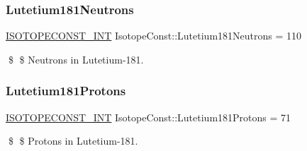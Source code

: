 \subsubsection{\texorpdfstring{Lutetium181\+Neutrons}{Lutetium181Neutrons}}
{\footnotesize\ttfamily \mbox{\hyperlink{group___isotope_const-_macros_ga5f18360b3e99483a35c32d789e62621c}{I\+S\+O\+T\+O\+P\+E\+C\+O\+N\+S\+T\+\_\+\+I\+NT}} Isotope\+Const\+::\+Lutetium181\+Neutrons = 110}

\$ \$ Neutrons in Lutetium-\/181. \mbox{\label{group___isotope_const-_lutetium-_lu181_gaf7781df50eef035540c7e0ad4e85c56b}} 
\subsubsection{\texorpdfstring{Lutetium181\+Protons}{Lutetium181Protons}}
{\footnotesize\ttfamily \mbox{\hyperlink{group___isotope_const-_macros_ga5f18360b3e99483a35c32d789e62621c}{I\+S\+O\+T\+O\+P\+E\+C\+O\+N\+S\+T\+\_\+\+I\+NT}} Isotope\+Const\+::\+Lutetium181\+Protons = 71}

\$ \$ Protons in Lutetium-\/181. 